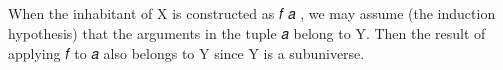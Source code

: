 \begin{code}
\AgdaSpace{}%
\AgdaSpace{}%
\AgdaSpace{}%
\<%
\\
%
\>[2]\AgdaSpace{}%
\AgdaSpace{}%
\AgdaSymbol{=}\AgdaSpace{}%
\AgdaSpace{}%
\AgdaSpace{}%
\AgdaSpace{}%
\AgdaSpace{}%
\AgdaSpace{}%
\AgdaSymbol{(}\AgdaSpace{}%
\AgdaSymbol{)}\<%
\\
%
\\[\AgdaEmptyExtraSkip]%
%
\>[2]\AgdaSpace{}%
\AgdaSymbol{:}\AgdaSpace{}%
\AgdaSymbol{(}\AgdaSpace{}%
\AgdaSpace{}%
\AgdaSymbol{)}\AgdaSpace{}%
\AgdaSpace{}%
\AgdaSpace{}%
\<%
\\
%
\>[2]\AgdaSpace{}%
\AgdaSymbol{=}\AgdaSpace{}%
\AgdaSpace{}%
\AgdaSpace{}%
\AgdaSpace{}%
\<%
\end{code}
\ccpad
When the inhabitant of  \ab X is constructed as  \ab 𝑓 \ab 𝑎 , we may assume (the induction hypothesis) that the arguments in the tuple \ab 𝑎 belong to \ab Y. Then the result of applying \ab 𝑓 to \ab 𝑎 also belongs to \ab Y since \ab Y is a subuniverse.

